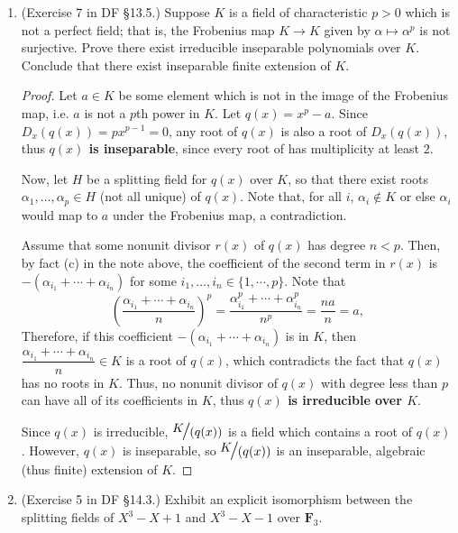\documentclass[10pt]{article}
\begin{document}
\begin{enumerate}
\begin{proof}
\end{proof}


\item (Exercise 7 in DF \S 13.5.) Suppose $K$ is a field of characteristic $p>0$ which is not a perfect field; that is, the Frobenius map $K \rightarrow K$ given by $\alpha \mapsto \alpha^p$ is not surjective.  Prove there exist irreducible inseparable polynomials over $K$.  Conclude that there exist inseparable finite extension of $K$.

\begin{proof}

Let $a \in K$ be some element which is not in the image of the Frobenius map, i.e. $a$ is not a $p$th power in $K$.  Let $q(x) = x^p - a$.  Since $D_x(q(x)) = px^{p-1} = 0$, any root of $q(x)$ is also a root of $D_x(q(x))$, thus \textbf{$q(x)$ is inseparable}, since every root of has multiplicity at least $2$.

Now, let $H$ be a splitting field for $q(x)$ over $K$, so that there exist roots $\alpha_1, \dots , \alpha_p \in H$ (not all unique) of $q(x)$.  Note that, for all $i$, $\alpha_i \not \in K$ or else $\alpha_i$ would map to $a$ under the Frobenius map, a contradiction.

Assume that some nonunit divisor $r(x)$ of $q(x)$ has degree $n < p$.  Then, by fact (c) in the note above, the coefficient of the second term in $r(x)$ is $-(\alpha_{i_1} + \cdots + \alpha_{i_n})$ for some $i_1, \dots , i_n \in \{1, \cdots , p \}$.  Note that
$$
\left( \dfrac{\alpha_{i_1} + \cdots + \alpha_{i_n}}{n} \right)^p = \frac{\alpha_{i_1}^p + \cdots + \alpha_{i_n}^p}{n^p} = \frac{na}{n} = a,
$$
Therefore, if this coefficient $-(\alpha_{i_1} + \cdots + \alpha_{i_n})$ is in $K$, then $\dfrac{\alpha_{i_1} + \cdots + \alpha_{i_n}}{n} \in K$ is a root of $q(x)$, which contradicts the fact that $q(x)$ has no roots in $K$.  Thus, no nonunit divisor of $q(x)$ with degree less than $p$ can have all of its coefficients in $K$, thus \textbf{$q(x)$ is irreducible over $K$}.

Since $q(x)$ is irreducible, $\mathlarger{\mathlarger{\mathlarger{\nicefrac{K}{(q(x))}}}}$ is a field which contains a root of $q(x)$.  However, $q(x)$ is inseparable, so $\mathlarger{\mathlarger{\mathlarger{\nicefrac{K}{(q(x))}}}}$ is an inseparable, algebraic (thus finite) extension of $K$.

\end{proof}

\item (Exercise 5 in DF \S 14.3.) Exhibit an explicit isomorphism between the splitting fields of $X^3-X+1$ and $X^3-X-1$ over $\mathbf{F}_3$.


\end{enumerate}
\end{document}
